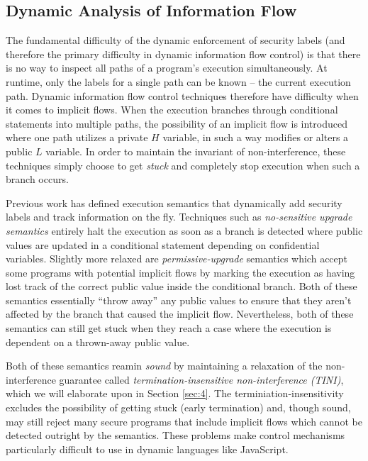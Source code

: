 \documentclass[preprint]{sigplanconf}
\begin{document}
\subsection*{Dynamic Analysis of Information Flow}
\label{sec:2.2}

The fundamental difficulty of the dynamic enforcement of security labels (and therefore the primary difficulty in dynamic information flow control) is that there is no way to inspect all paths of a program's execution simultaneously. At runtime, only the labels for a single path can be known -- the current execution path. Dynamic information flow control techniques therefore have difficulty when it comes to implicit flows. When the execution branches through conditional statements into multiple paths, the possibility of an implicit flow is introduced where one path utilizes a private $H$ variable, in such a way modifies or alters a public $L$ variable. In order to maintain the invariant of non-interference, these techniques simply choose to get \textit{stuck} and completely stop execution when such a branch occurs.

Previous work has defined execution semantics that dynamically add security labels and track information on the fly. Techniques such as \textit{no-sensitive upgrade semantics} \cite{austin2009efficient, zdancewic2002programming} entirely halt the execution as soon as a branch is detected where public values are updated in a conditional statement depending on confidential variables. Slightly more relaxed are \textit{permissive-upgrade} semantics \cite{austin2010permissive} which accept some programs with potential implicit flows by marking the execution as having lost track of the correct public value inside the conditional branch. Both of these semantics essentially ``throw away'' any public values to ensure that they aren't affected by the branch that caused the implicit flow. Nevertheless, both of these semantics can still get stuck when they reach a case where the execution is dependent on a thrown-away public value.

Both of these semantics reamin \textit{sound} by maintaining a relaxation of the non-interference guarantee called \textit{termination-insensitive non-interference (TINI)}, which we will elaborate upon in Section \ref{sec:4}. The terminiation-insensitivity excludes the possibility of getting stuck (early termination) and, though sound, may still reject many secure programs that include implicit flows which cannot be detected outright by the semantics. These problems make control mechanisms particularly difficult to use in dynamic languages like JavaScript. 
\end{document}
